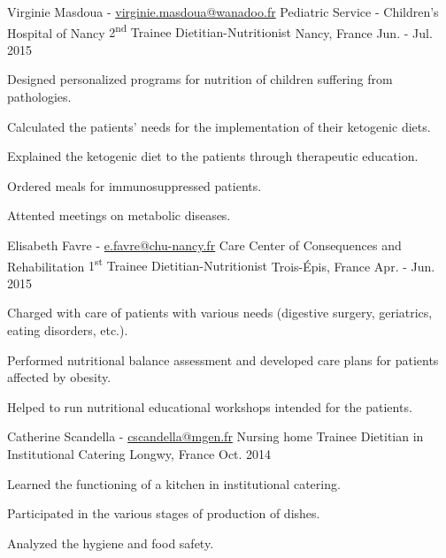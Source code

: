 \begin{cventries}
{\begin{cvitems}
      \end{cvitems}
    }
    {Virginie Masdoua - \href{mailto:virginie.masdoua@wanadoo.fr}{virginie.masdoua@wanadoo.fr}}
  \cventry
    {Pediatric Service - Children's Hospital of Nancy}
    {2\textsuperscript{nd} Trainee Dietitian-Nutritionist}
    {Nancy, France}
    {Jun. - Jul. 2015}
    {
      \begin{cvitems}
        \item {Designed personalized programs for nutrition of children suffering from pathologies.}
        \item {Calculated the patients' needs for the implementation of their ketogenic diets.}
        \item {Explained the ketogenic diet to the patients through therapeutic education.}
        \item {Ordered meals for immunosuppressed patients.}
        \item {Attented meetings on metabolic diseases.}
      \end{cvitems}
    }
    {Elisabeth Favre - \href{mailto:e.favre@chu-nancy.fr}{e.favre@chu-nancy.fr}}
  \cventry
    {Care Center of Consequences and Rehabilitation}
    {1\textsuperscript{st} Trainee Dietitian-Nutritionist}
    {Trois-Épis, France}
    {Apr. - Jun. 2015}
    {
      \begin{cvitems}
        \item {Charged with care of patients with various needs (digestive surgery, geriatrics, eating disorders, etc.).}
        \item {Performed nutritional balance assessment and developed care plans for patients affected by obesity.}
        \item {Helped to run nutritional educational workshops intended for the patients.}
      \end{cvitems}
    }
    {Catherine Scandella - \href{mailto:cscandella@mgen.fr}{cscandella@mgen.fr}}
  \cventry
    {Nursing home}
    {Trainee Dietitian in Institutional Catering}
    {Longwy, France}
    {Oct. 2014}
    {
      \begin{cvitems}
        \item {Learned the functioning of a kitchen in institutional catering.}
        \item {Participated in the various stages of production of dishes.}
        \item {Analyzed the hygiene and food safety.}
      \end{cvitems}
    }
    {}
\end{cventries}

\clearpage